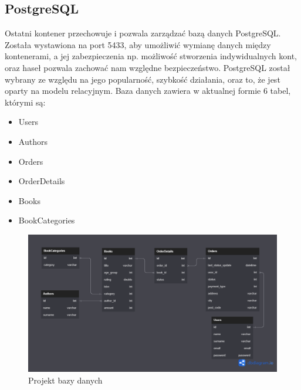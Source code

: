 \documentclass[]{article}
\begin{document}
\subsection{PostgreSQL}
Ostatni kontener przechowuje i pozwala zarządzać bazą danych PostgreSQL. Została wystawiona na port 5433, aby umożliwić wymianę danych między kontenerami, a jej zabezpieczenia np. możliwość stworzenia indywidualnych kont, oraz haseł pozwala zachować nam względne bezpieczeństwo. PostgreSQL został wybrany ze względu na jego popularność, szybkość działania, oraz to, że jest oparty na modelu relacyjnym.
Baza danych zawiera w aktualnej formie 6 tabel, którymi są:
\begin{itemize}
	\item Users
	\item Authors
	\item Orders
	\item OrderDetails
	\item Books
	\item BookCategories
\end{itemize}
\begin{figure}[h]
	\centering
	\includegraphics[scale=0.35]{../../DbDiagram.png}
	\caption{Projekt bazy danych}
\end{figure}
\end{document}
